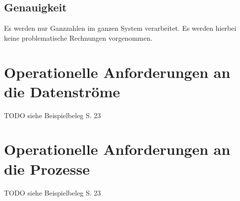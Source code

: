 \subsection{Genauigkeit}
Es werden nur Ganzzahlen im ganzen System verarbeitet. Es werden hierbei keine problematische Rechnungen vorgenommen.

\section{Operationelle Anforderungen an die Datenströme}
TODO siehe Beispielbeleg S. 23

\section{Operationelle Anforderungen an die Prozesse}
TODO siehe Beispielbeleg S. 23
